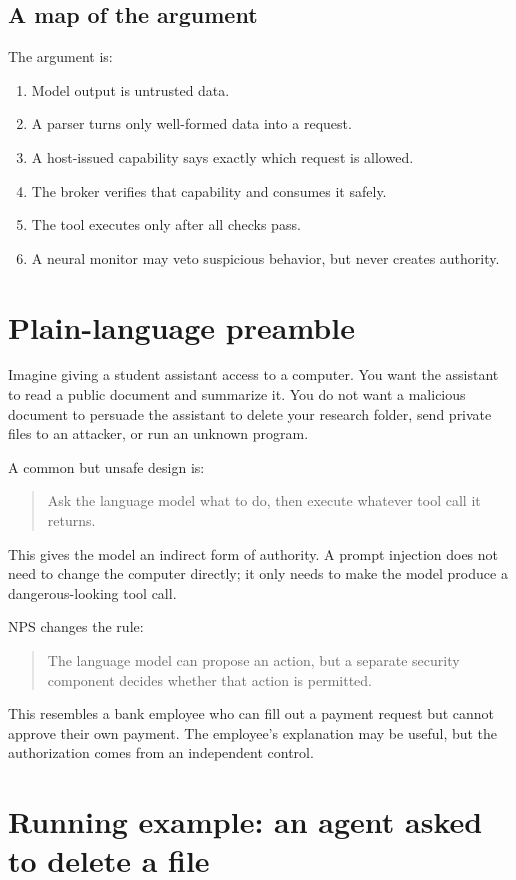 \documentclass[11pt]{article}
\begin{document}
\subsection{A map of the argument}
The argument is:
\begin{enumerate}
  \item Model output is untrusted data.
  \item A parser turns only well-formed data into a request.
  \item A host-issued capability says exactly which request is allowed.
  \item The broker verifies that capability and consumes it safely.
  \item The tool executes only after all checks pass.
  \item A neural monitor may veto suspicious behavior, but never creates authority.
\end{enumerate}

\section{Plain-language preamble}

Imagine giving a student assistant access to a computer. You want the assistant to read a public document and summarize it. You do not want a malicious document to persuade the assistant to delete your research folder, send private files to an attacker, or run an unknown program.

A common but unsafe design is:
\begin{quote}
Ask the language model what to do, then execute whatever tool call it returns.
\end{quote}
This gives the model an indirect form of authority. A prompt injection does not need to change the computer directly; it only needs to make the model produce a dangerous-looking tool call.

NPS changes the rule:
\begin{quote}
The language model can propose an action, but a separate security component decides whether that action is permitted.
\end{quote}

This resembles a bank employee who can fill out a payment request but cannot approve their own payment. The employee's explanation may be useful, but the authorization comes from an independent control.

\section{Running example: an agent asked to delete a file}
\end{document}
